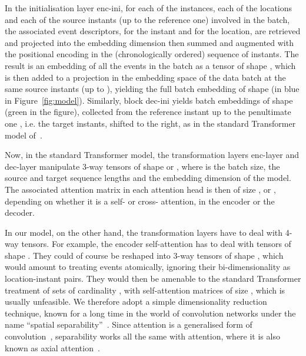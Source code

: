 \documentclass[a4paper]{article}
\begin{document}
In the initialisation layer {\sc enc-ini}, for each of the  instances, each of the  locations and each of the  source instants (up to the reference one) involved in the batch, the associated event descriptors, for the instant and for the location, are retrieved and projected into the embedding dimension  then summed and augmented with the positional encoding in the (chronologically ordered) sequence of instants. The result is an embedding of all the events in the batch as a tensor of shape , which is then added to a projection in the embedding space of the data batch at the same source instants (up to ), yielding the full batch embedding of shape  (in blue in Figure~\ref{fig:model}). Similarly, block {\sc dec-ini} yields batch embeddings of shape  (green in the figure), collected from the reference instant  up to the penultimate one , i.e. the target instants, shifted to the right, as in the standard Transformer model of~\cite{vaswani_attention_2017}.

Now, in the standard Transformer model, the transformation layers {\sc enc-layer} and {\sc dec-layer} manipulate 3-way tensors of shape  or  , where  is the batch size,  the source and target sequence lengths and  the embedding dimension of the model. The associated attention matrix in each attention head is then of size ,  or , depending on whether it is a self- or cross- attention, in the encoder or the decoder.

In our model, on the other hand, the transformation layers have to deal with 4-way tensors. For example, the encoder self-attention has to deal with tensors of shape . They could of course be reshaped into 3-way tensors of shape , which would amount to treating events atomically, ignoring their bi-dimensionality as location-instant pairs. They would then be amenable to the standard Transformer treatment of sets of cardinality , with self-attention matrices of size , which is usually unfeasible. We therefore adopt a simple dimensionality reduction technique, known for a long time in the world of convolution networks under the name ``spatial separability''~\cite{szegedy_rethinking_2015}. Since attention is a generalised form of convolution~\cite{andreoli_convolution_2019}, separability works all the same with attention, where it is also known as axial attention~\cite{ho_axial_2019}.
\end{document}
